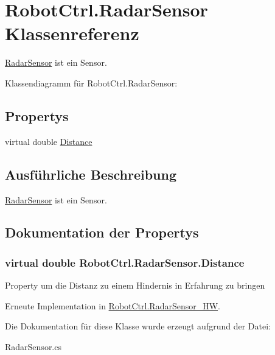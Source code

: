 \hypertarget{class_robot_ctrl_1_1_radar_sensor}{
\section{RobotCtrl.RadarSensor Klassenreferenz}
\label{class_robot_ctrl_1_1_radar_sensor}
}


\hyperlink{class_robot_ctrl_1_1_radar_sensor}{RadarSensor} ist ein Sensor.  




Klassendiagramm für RobotCtrl.RadarSensor:\subsection*{Propertys}
\begin{DoxyCompactItemize}
\item 
virtual double \hyperlink{class_robot_ctrl_1_1_radar_sensor_a1be5541f3153ba40736f7a9fa292375b}{Distance}
\end{DoxyCompactItemize}


\subsection{Ausführliche Beschreibung}
\hyperlink{class_robot_ctrl_1_1_radar_sensor}{RadarSensor} ist ein Sensor. 

\subsection{Dokumentation der Propertys}
\hypertarget{class_robot_ctrl_1_1_radar_sensor_a1be5541f3153ba40736f7a9fa292375b}{
\subsubsection[{Distance}]{\setlength{\rightskip}{0pt plus 5cm}virtual double RobotCtrl.RadarSensor.Distance}}
\label{class_robot_ctrl_1_1_radar_sensor_a1be5541f3153ba40736f7a9fa292375b}
Property um die Distanz zu einem Hindernis in Erfahrung zu bringen 

Erneute Implementation in \hyperlink{class_robot_ctrl_1_1_radar_sensor___h_w_a0eb1060a6e45bb29fdbf99e35481311e}{RobotCtrl.RadarSensor\_\-HW}.



Die Dokumentation für diese Klasse wurde erzeugt aufgrund der Datei:\begin{DoxyCompactItemize}
\item 
RadarSensor.cs\end{DoxyCompactItemize}
